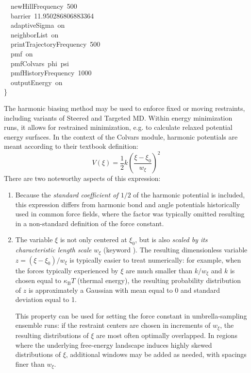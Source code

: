\begin{cvexampleinput}
\-~~newHillFrequency~500              \\
\-~~barrier~11.950286806883364        \\
\-~~adaptiveSigma~on                  \\
\-~~neighborList~on                   \\
\-~~printTrajectoryFrequency~500      \\
\-~~pmf~on                            \\
\-~~pmfColvars~phi~psi                \\
\-~~pmfHistoryFrequency~1000          \\
\-~~outputEnergy~on                   \\
\-\}
\end{cvexampleinput}



The harmonic biasing method may be used to enforce fixed or moving restraints,
including variants of Steered and Targeted MD. Within energy minimization
runs, it allows for restrained minimization, e.g. to calculate relaxed potential
energy surfaces. In the context of the Colvars module,
harmonic potentials are meant according to their textbook definition:
\begin{equation}
  \label{eq:colvarbias_harmonic}
  V\left(\xi\right) = \frac{1}{2} k \left(\frac{\xi - \xi_0}{w_{\xi}}\right)^2
\end{equation}
There are two noteworthy aspects of this expression:
\begin{enumerate}
\item Because the \emph{standard coefficient of $1/2$} of the harmonic potential is included, this expression differs from harmonic bond and angle potentials historically used in common force fields, where the factor was typically omitted resulting in a non-standard definition of the force constant.
\item The variable $\xi$ is not only centered at $\xi_0$, but is also \emph{scaled by its characteristic length scale} $w_{\xi}$ (keyword ).
  The resulting dimensionless variable $z = (\xi - \xi_0)/w_{\xi}$ is typically easier to treat numerically: for example, when the forces typically experienced by $\xi$ are much smaller than $k/w_{\xi}$ and $k$ is chosen equal to $\kappa_{\mathrm{B}}T$ (thermal energy), the resulting probability distribution of $z$ is approximately a Gaussian with mean equal to 0 and standard deviation equal to 1.

  This property can be used for setting the force constant in umbrella-sampling ensemble runs: if the restraint centers are chosen in increments of $w_{\xi}$, the resulting distributions of $\xi$ are most often optimally overlapped.
  In regions where the underlying free-energy landscape induces highly skewed distributions of $\xi$, additional windows may be added as needed, with spacings finer than $w_{\xi}$.
\end{enumerate}

